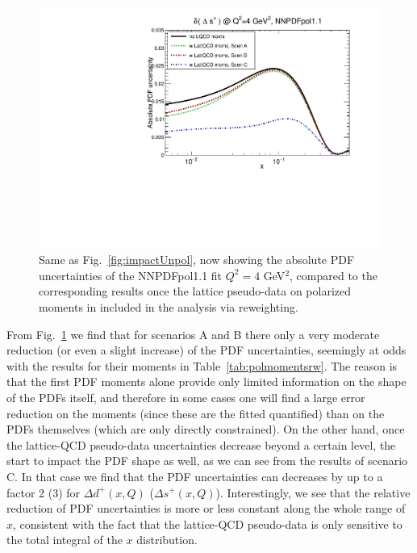 \begin{figure}[!t]
\includegraphics[scale=0.45]{plots/xsp-pol-lattice-relerr.pdf}
\caption{\small Same as Fig.~\ref{fig:impactUnpol}, now
  showing the absolute PDF uncertainties of the NNPDFpol1.1 fit
   $Q^2=4$ GeV$^2$,
  compared to the corresponding results once the lattice pseudo-data
  on polarized moments in included in the analysis via
  reweighting.
}    
\label{fig:impactPol}
\end{figure}

From Fig.~\ref{fig:impactPol} we find that for scenarios
A and B there only a very moderate reduction (or even a slight increase)
of the PDF uncertainties, seemingly at odds with the results
for their moments in Table~\ref{tab:polmomentsrw}.
%
The reason is that the first PDF moments alone provide only limited
information on the shape of the PDFs itself, and therefore in some
cases one will find a large error reduction on the moments (since these
are the fitted quantified) than on the PDFs themselves (which are
only directly constrained).
%
On the other hand, once the lattice-QCD pseudo-data uncertainties
decrease beyond a certain level, the start to impact the PDF shape
as well, as we can see from the results of scenario C.
%
In that case we find that the PDF uncertainties can decreases by up to a factor
2 (3) for $\Delta d^+(x,Q)$ ($\Delta s^+(x,Q)$).
%
Interestingly, we see that the relative reduction of PDF uncertainties is more
or less constant along the whole range of $x$, consistent with the fact that
the lattice-QCD pseudo-data is only sensitive to the total integral
of the $x$ distribution.




